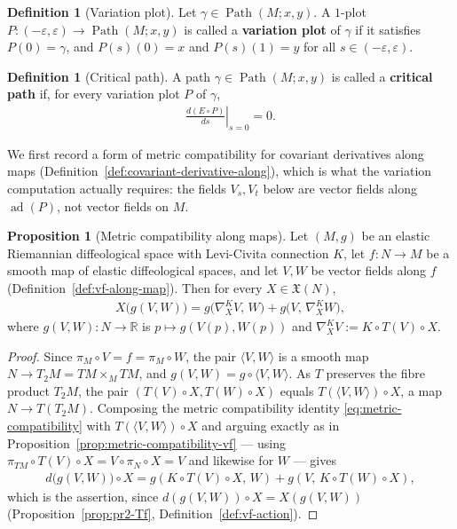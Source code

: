 \documentclass{amsart}
\newcommand{\R}{\mathbb{R}}
\DeclareMathOperator{\Path}{Path}
\DeclareMathOperator{\ad}{ad}
\theoremstyle{definition}
\newtheorem{defn}[thm]{Definition}
\newtheorem{prop}[thm]{Proposition}
\begin{document}
\begin{defn}[Variation plot]\label{def:variation-plot}
  Let $\gamma \in \Path(M; x, y)$.
  A $1$-plot $P \colon (-\varepsilon, \varepsilon) \to \Path(M; x, y)$
  is called a \textbf{variation plot} of $\gamma$ if it satisfies
  $P(0) = \gamma$, and $P(s)(0) = x$ and $P(s)(1) = y$ for all
  $s \in (-\varepsilon, \varepsilon)$.
\end{defn}

\begin{defn}[Critical path]\label{def:critical-path}
  A path $\gamma \in \Path(M; x, y)$ is called a \textbf{critical path}
  if, for every variation plot $P$ of $\gamma$,
  \begin{align*}
    \left. \frac{d(E \circ P)}{ds} \right|_{s = 0} = 0.
  \end{align*}
\end{defn}

We first record a form of metric compatibility for covariant derivatives along
maps (Definition~\ref{def:covariant-derivative-along}), which is what the
variation computation actually requires: the fields $V_s, V_t$ below are
vector fields along $\ad(P)$, not vector fields on $M$.

\begin{prop}[Metric compatibility along maps]\label{prop:metric-compat-along}
  Let $(M, g)$ be an elastic Riemannian diffeological space with Levi-Civita
  connection $K$, let $f \colon N \to M$ be a smooth map of elastic
  diffeological spaces, and let $V, W$ be vector fields along $f$
  (Definition~\ref{def:vf-along-map}). Then for every $X \in \mathfrak{X}(N)$,
  \begin{align*}
    X\bigl(g(V, W)\bigr)
      = g\bigl(\nabla^K_X V,\, W\bigr) + g\bigl(V,\, \nabla^K_X W\bigr),
  \end{align*}
  where $g(V, W) \colon N \to \R$ is $p \mapsto g(V(p), W(p))$ and
  $\nabla^K_X V := K \circ T(V) \circ X$.
\end{prop}

\begin{proof}
  Since $\pi_M \circ V = f = \pi_M \circ W$, the pair $\langle V, W \rangle$ is
  a smooth map $N \to T_2M = TM \times_M TM$, and $g(V, W) = g \circ \langle V,
  W \rangle$. As $T$ preserves the fibre product $T_2M$, the pair $(T(V) \circ
  X, T(W) \circ X)$ equals $T(\langle V, W \rangle) \circ X$, a map
  $N \to T(T_2M)$. Composing the metric compatibility identity
  \eqref{eq:metric-compatibility} with $T(\langle V, W\rangle) \circ X$ and
  arguing exactly as in Proposition~\ref{prop:metric-compatibility-vf} --- using
  $\pi_{TM} \circ T(V) \circ X = V \circ \pi_N \circ X = V$ and likewise for $W$
  --- gives
  \begin{align*}
    d\bigl(g(V,W)\bigr) \circ X
      = g(K \circ T(V) \circ X,\, W) + g(V,\, K \circ T(W) \circ X),
  \end{align*}
  which is the assertion, since $d(g(V,W)) \circ X = X(g(V,W))$
  (Proposition~\ref{prop:pr2-Tf}, Definition~\ref{def:vf-action}).
\end{proof}
\end{document}
